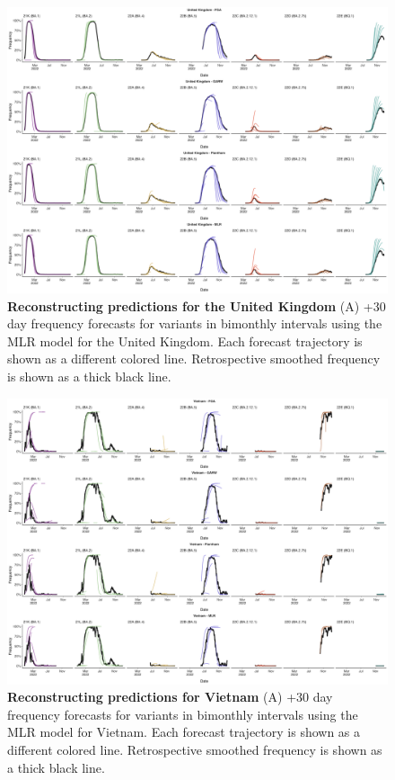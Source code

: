 \begin{figure}[th!]
	\centering
	\includegraphics[width=0.9\textwidth=0.01]{supp_figures/supplementary_fig_United Kingdom.png}
	\caption{
		\textbf{Reconstructing predictions for the United Kingdom}
		(A) +30 day frequency forecasts for variants in bimonthly intervals using the MLR model for the United Kingdom.
		Each forecast trajectory is shown as a different colored line.
		Retrospective smoothed frequency is shown as a thick black line.
	}
	\label{fig:S6}
\end{figure}



\begin{figure}[th!]
	\centering
	\includegraphics[width=0.9\textwidth=0.01]{supp_figures/supplementary_fig_Vietnam.png}
	\caption{
		\textbf{Reconstructing predictions for Vietnam}
		(A) +30 day frequency forecasts for variants in bimonthly intervals using the MLR model for Vietnam.
		Each forecast trajectory is shown as a different colored line.
		Retrospective smoothed frequency is shown as a thick black line.
	}
	\label{fig:S7}
\end{figure}

